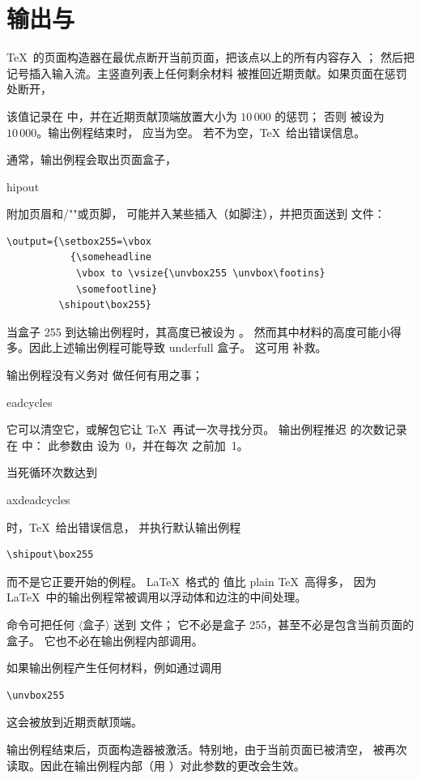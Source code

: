 \documentclass[a4paper]{rapport3}
\makeatletter
\def\gr#1{$\langle$#1$\rangle$}\def\key#1{{\tt#1}}
\def\alt{}\def\altt{}%
\def\cstoidx#1\par{\index{#1@\cs{#1}}}
\def\csidx#1{\cstoidx #1\par\cs{#1}}
\makeatother
\begin{document}
\section{输出与 \protect{}}
\label{output255}

\TeX\ 的页面构造器在最优点断开当前页面，把该点以上的所有内容存入 ；
然后把  记号插入输入流。主竖直列表上任何剩余材料
被推回近期贡献。如果页面在惩罚处断开，
\alt
该值记录在  中，并在近期贡献顶端放置大小为 $10\,000$ 的惩罚；
否则  被设为~$10\,000$。输出例程结束时， 应当为空。
若不为空，\TeX\ 给出错误信息。

通常，输出例程会取出页面盒子，
\cstoidx shipout\par
\mdqon
附加页眉和/""或页脚，
\mdqoff
可能并入某些插入（如脚注），并把页面送到  文件：
\begin{verbatim}
\output={\setbox255=\vbox
           {\someheadline 
            \vbox to \vsize{\unvbox255 \unvbox\footins}
            \somefootline}
         \shipout\box255}
\end{verbatim}
当盒子 255 到达输出例程时，其高度已被设为 。
然而其中材料的高度可能小得多。因此上述输出例程可能导致 underfull 盒子。
这可用  补救。

输出例程没有义务对  做任何有用之事；
\cstoidx deadcycles\par
它可以清空它，或解包它让 \TeX\ 再试一次寻找分页。
输出例程推迟  的次数记录在  中：
此参数由  设为~0，并在每次  之前加~1。

当死循环次数达到 \csidx{maxdeadcycles} 时，\TeX\ 给出错误信息，
并执行默认输出例程
\begin{verbatim}
\shipout\box255
\end{verbatim}
而不是它正要开始的例程。
\LaTeX\ 格式的  值比 plain \TeX\ 高得多，
因为 \LaTeX\ 中的输出例程常被调用以浮动体和边注的中间处理。

 命令可把任何 \gr{盒子} 送到  文件；
它不必是盒子 255，甚至不必是包含当前页面的盒子。
它也不必在输出例程内部调用。

如果输出例程产生任何材料，例如通过调用
\begin{verbatim}
\unvbox255
\end{verbatim}
这会被放到近期贡献顶端。

输出例程结束后，页面构造器被激活。特别地，由于当前页面已被清空，
 被再次读取。因此在输出例程内部（用 ）对此参数的更改会生效。
\end{document}
